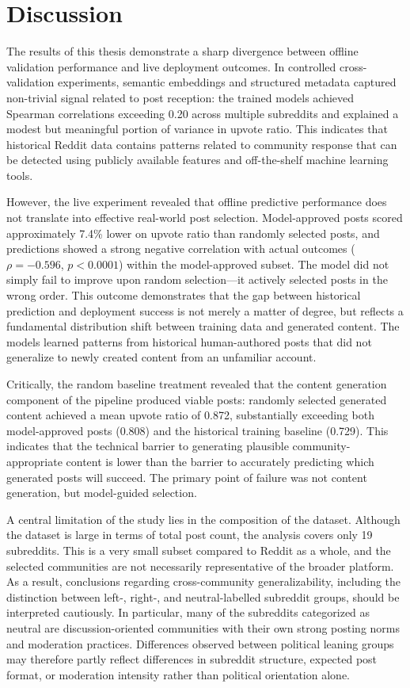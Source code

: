 \chapter{Discussion}
\label{chap:discussion}

The results of this thesis demonstrate a sharp divergence between offline validation performance and live deployment outcomes. In controlled cross-validation experiments, semantic embeddings and structured metadata captured non-trivial signal related to post reception: the trained models achieved Spearman correlations exceeding 0.20 across multiple subreddits and explained a modest but meaningful portion of variance in upvote ratio. This indicates that historical Reddit data contains patterns related to community response that can be detected using publicly available features and off-the-shelf machine learning tools.

However, the live experiment revealed that offline predictive performance does not translate into effective real-world post selection. Model-approved posts scored approximately 7.4\% lower on upvote ratio than randomly selected posts, and predictions showed a strong negative correlation with actual outcomes ($\rho = -0.596$, $p < 0.0001$) within the model-approved subset. The model did not simply fail to improve upon random selection—it actively selected posts in the wrong order. This outcome demonstrates that the gap between historical prediction and deployment success is not merely a matter of degree, but reflects a fundamental distribution shift between training data and generated content. The models learned patterns from historical human-authored posts that did not generalize to newly created content from an unfamiliar account.

Critically, the random baseline treatment revealed that the content generation component of the pipeline produced viable posts: randomly selected generated content achieved a mean upvote ratio of 0.872, substantially exceeding both model-approved posts (0.808) and the historical training baseline (0.729). This indicates that the technical barrier to generating plausible community-appropriate content is lower than the barrier to accurately predicting which generated posts will succeed. The primary point of failure was not content generation, but model-guided selection.

A central limitation of the study lies in the composition of the dataset. Although the dataset is large in terms of total post count, the analysis covers only 19 subreddits. This is a very small subset compared to Reddit as a whole, and the selected communities are not necessarily representative of the broader platform. As a result, conclusions regarding cross-community generalizability, including the distinction between left-, right-, and neutral-labelled subreddit groups, should be interpreted cautiously. In particular, many of the subreddits categorized as neutral are discussion-oriented communities with their own strong posting norms and moderation practices. Differences observed between political leaning groups may therefore partly reflect differences in subreddit structure, expected post format, or moderation intensity rather than political orientation alone.

